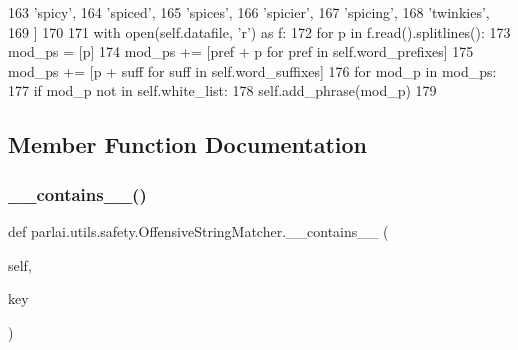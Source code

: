 \begin{DoxyCode}
163             \textcolor{stringliteral}{'spicy'},
164             \textcolor{stringliteral}{'spiced'},
165             \textcolor{stringliteral}{'spices'},
166             \textcolor{stringliteral}{'spicier'},
167             \textcolor{stringliteral}{'spicing'},
168             \textcolor{stringliteral}{'twinkies'},
169         ]
170 
171         with open(self.datafile, \textcolor{stringliteral}{'r') as f:}
172 \textcolor{stringliteral}{            }\textcolor{keywordflow}{for} p \textcolor{keywordflow}{in} f.read().splitlines():
173                 mod\_ps = [p]
174                 mod\_ps += [pref + p \textcolor{keywordflow}{for} pref \textcolor{keywordflow}{in} self.word\_prefixes]
175                 mod\_ps += [p + suff \textcolor{keywordflow}{for} suff \textcolor{keywordflow}{in} self.word\_suffixes]
176                 \textcolor{keywordflow}{for} mod\_p \textcolor{keywordflow}{in} mod\_ps:
177                     \textcolor{keywordflow}{if} mod\_p \textcolor{keywordflow}{not} \textcolor{keywordflow}{in} self.white\_list:
178                         self.add\_phrase(mod\_p)
179 
\end{DoxyCode}


\subsection{Member Function Documentation}
\mbox{\label{classparlai_1_1utils_1_1safety_1_1OffensiveStringMatcher_a89e75aea403630f53f41502fead9708e}} 
\subsubsection{\texorpdfstring{\+\_\+\+\_\+contains\+\_\+\+\_\+()}{\_\_contains\_\_()}}
{\footnotesize\ttfamily def parlai.\+utils.\+safety.\+Offensive\+String\+Matcher.\+\_\+\+\_\+contains\+\_\+\+\_\+ (\begin{DoxyParamCaption}\item[{}]{self,  }\item[{}]{key }\end{DoxyParamCaption})}

